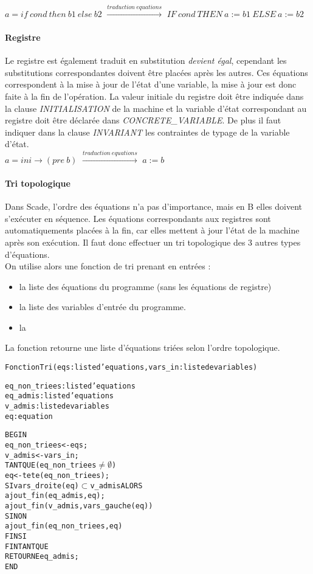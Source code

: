 $ a = if~ cond~ then~ b1~ else~ b2$ $\xrightarrow{traduction ~ equations}$ $IF ~cond~ THEN ~a:=b1~ ELSE
~a:=b2$

\paragraph{Registre}
Le registre est également traduit en substitution \emph{devient égal}, cependant
les substitutions correspondantes doivent être placées après les autres. Ces
équations correspondent à la mise à jour de l'état d'une variable, la mise à
jour est donc faite à la fin de l'opération. La valeur initiale du registre doit
être indiquée dans la clause \emph{INITIALISATION} de la machine et la variable d'état
correspondant au registre doit être déclarée dans \emph{CONCRETE\_VARIABLE}. De
plus il faut indiquer dans la clause \emph{INVARIANT} les contraintes de typage
de la variable d'état. \\

$a = ini \rightarrow (pre ~b)$ $\xrightarrow{traduction ~ equations}$ $a := b$ 

\paragraph{Tri topologique}
Dans Scade, l'ordre des équations n'a pas d'importance, mais en B elles doivent
s'exécuter en séquence. Les équations correspondants aux registres sont
automatiquements placées à la fin, car elles mettent à jour l'état de la machine
après son exécution. Il faut donc effectuer un tri topologique des 3 autres
types d'équations.\\
On utilise alors une fonction de tri prenant en entrées :
\begin{itemize}
\item la liste des équations du programme (sans les équations de registre)
\item la liste des variables d'entrée du programme. 
\item la
\end{itemize}
La fonction retourne une liste d'équations triées selon l'ordre
topologique.

\begin{alltt}
Fonction Tri (eqs: liste d'equations, vars\_in: liste de variables)

eq\_non\_triees : liste d'equations
eq\_admis : liste d'equations
v\_admis : liste de variables 
eq : equation

BEGIN
 eq\_non\_triees <- eqs;
 v\_admis <- vars\_in;
 TANT QUE (eq\_non\_triees \(\neq \emptyset \)) 
    eq <- tete(eq\_non\_triees);
    SI vars\_droite(eq) \(\subset\) v\_admis ALORS
       ajout\_fin(eq\_admis, eq);
       ajout\_fin(v\_admis, vars\_gauche(eq))
    SINON
       ajout\_fin(eq\_non\_triees, eq)
    FIN SI
 FIN TANT QUE
 RETOURNE eq\_admis;
END

\end{alltt}

